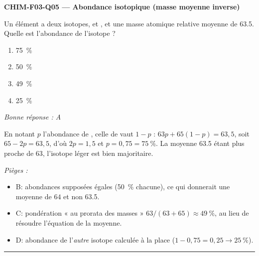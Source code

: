 \documentclass[11pt,a4paper]{article}
\begin{document}
\noindent\textbf{CHIM-F03-Q05 --- Abondance isotopique (masse moyenne inverse)}\par
Un élément a deux isotopes,  et , et une masse atomique relative moyenne de \num{63.5}. Quelle est l'abondance de l'isotope  ?
\begin{enumerate}[label=\Alph*)]
\item \qty{75}{\percent}
\item \qty{50}{\percent}
\item \qty{49}{\percent}
\item \qty{25}{\percent}
\end{enumerate}
\textit{Bonne réponse : A}\par
En notant $p$ l'abondance de , celle de  vaut $1-p$ : $63p + 65(1-p) = 63{,}5$, soit $65 - 2p = 63{,}5$, d'où $2p = 1{,}5$ et $p = 0{,}75 = \qty{75}{\percent}$. La moyenne \num{63.5} étant plus proche de $63$, l'isotope léger est bien majoritaire.\par
\textit{Pièges :}
\begin{itemize}
\item B: abondances supposées égales (\qty{50}{\percent} chacune), ce qui donnerait une moyenne de $64$ et non \num{63.5}.
\item C: pondération « au prorata des masses » $63/(63+65) \approx \qty{49}{\percent}$, au lieu de résoudre l'équation de la moyenne.
\item D: abondance de l'\emph{autre} isotope  calculée à la place ($1-0{,}75 = 0{,}25 \to \qty{25}{\percent}$).
\end{itemize}
\vspace{8pt}\hrule\vspace{8pt}
\end{document}
